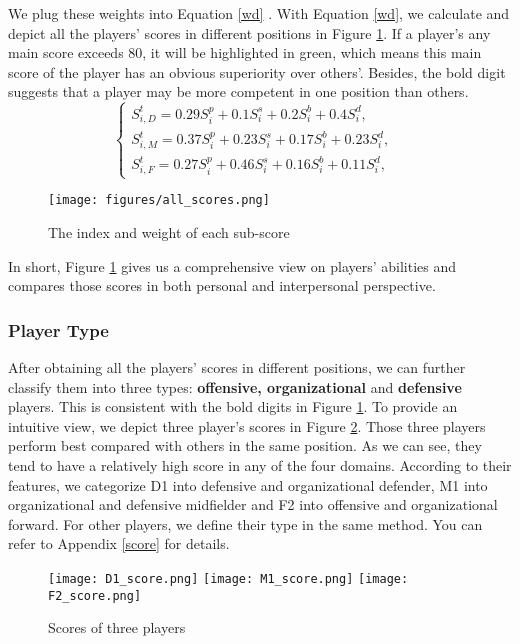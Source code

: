 \documentclass{mcmthesis}
\begin{document}
We plug these weights into Equation \eqref{wd} . With Equation \eqref{wd}, we calculate and depict all the players' scores in different positions in Figure \ref{all_scores}.  If a player's any main score exceeds 80, it will be highlighted in green, which means this main score of the player has an obvious superiority over others'. Besides, the bold digit suggests that a player may be more competent in one position than others.
\begin{equation}\label{wd}
\left\{
             \begin{array}{lr}
             S^{t}_{i,D}=0.29S^{p}_{i} + 0.1S^{s}_{i} + 0.2S^{b}_{i} + 0.4S^{d}_{i}, &  \\
             S^{t}_{i,M}=0.37S^{p}_{i} + 0.23S^{s}_{i} + 0.17S^{b}_{i} + 0.23S^{d}_{i}, &  \\
             S^{t}_{i,F}=0.27S^{p}_{i} + 0.46S^{s}_{i} + 0.16S^{b}_{i} + 0.11S^{d}_{i}, &
             \end{array}
\right.
\end{equation}

\begin{figure}[htbp]
  \centering
  \texttt{[image: figures/all\_scores.png]}
  \caption{The index and weight of each sub-score}\label{all_scores}
\end{figure}

In short, Figure \ref{all_scores} gives us a comprehensive view on players' abilities and compares those scores in both personal and interpersonal perspective.

\subsubsection{Player Type}
After obtaining all the players' scores in different positions, we can further classify them into three types: \textbf{offensive, organizational} and \textbf{defensive} players. This is consistent with the bold digits in Figure \ref{all_scores}. To provide an intuitive view, we depict three player's scores in Figure \ref{three}. Those three players perform best compared with others in the same position. As we can see, they tend to have a relatively high score in any of the four domains. According to their features, we categorize D1 into defensive and organizational defender, M1 into organizational and defensive midfielder and F2 into offensive and organizational forward. For other players, we define their type in the same method. You can refer to Appendix \ref{score} for details.
\begin{figure}[htbp]\centering
\texttt{[image: D1\_score.png]}
\texttt{[image: M1\_score.png]}
\texttt{[image: F2\_score.png]}
\caption{Scores of three players}\label{three}
\end{figure}
\end{document}
